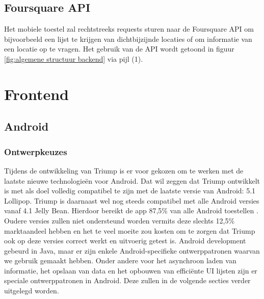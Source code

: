 \subsection{Foursquare API}
Het mobiele toestel zal rechtstreeks requests sturen naar de Foursquare API om bijvoorbeeld een lijst te krijgen van dichtbijzijnde locaties of om informatie van een locatie op te vragen. Het gebruik van de API wordt getoond in figuur \ref{fig:algemene structuur backend} via pijl (1).


\section{Frontend}
\subsection{Android}

\subsubsection{Ontwerpkeuzes}
Tijdens de ontwikkeling van Triump is er voor gekozen om te werken met de laatste nieuwe technologieën voor Android. Dat wil zeggen dat Triump ontwikkelt is met als doel volledig compatibel te zijn met de laatste versie van Android: 5.1 Lollipop. Triump is daarnaast wel nog steeds compatibel met alle Android versies vanaf 4.1 Jelly Bean. Hierdoor bereikt de app 87,5\% van alle Android toestellen \cite{market_share}. Oudere versies zullen niet ondersteund worden vermits deze slechts 12,5\% marktaandeel hebben en het te veel moeite zou kosten om te zorgen dat Triump ook op deze versies correct werkt en uitvoerig getest is.
Android development gebeurd in Java, maar er zijn enkele Android-specifieke ontwerppatronen waarvan we gebruik gemaakt hebben. Onder andere voor het asynchroon laden van informatie, het opslaan van data en het opbouwen van efficiënte UI lijsten zijn er speciale ontwerppatronen in Android. Deze zullen in de volgende secties verder uitgelegd worden.

